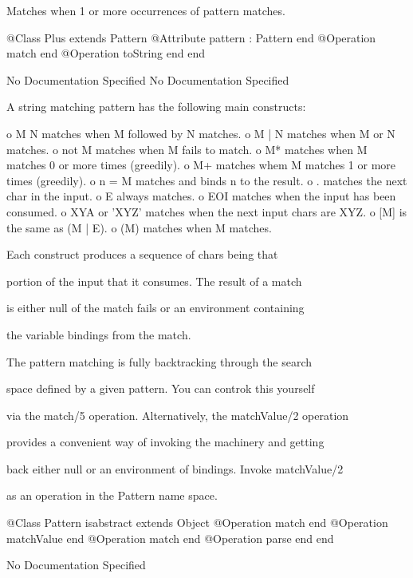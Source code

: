       Matches when 1 or more occurrences of pattern matches.
\begin{Interface}
@Class Plus extends Pattern
  @Attribute pattern : Pattern end
  @Operation match end
  @Operation toString end
end
\end{Interface}
No Documentation Specified
No Documentation Specified

      A string matching pattern has the following main constructs:

      
        o M N matches when M followed by N matches.
        o M | N matches when M or N matches.
        o not M matches when M fails to match.
        o M* matches when M matches 0 or more times (greedily).
        o M+ matches whem M matches 1 or more times (greedily).
        o n = M matches and binds n to the result.
        o . matches the next char in the input.
        o E always matches.
        o EOI matches when the input has been consumed.
        o XYA or 'XYZ' matches when the next input chars are XYZ.
        o [M] is the same as (M | E).
        o (M) matches when M matches.
        
      Each construct produces a sequence of chars being that

      portion of the input that it consumes. The result of a match

      is either null of the match fails or an environment containing

      the variable bindings from the match. 
      
      The pattern matching is fully backtracking through the search

      space defined by a given pattern. You can controk this yourself

      via the match/5 operation. Alternatively, the matchValue/2 operation

      provides a convenient way of invoking the machinery and getting

      back either null or an environment of bindings. Invoke matchValue/2

      as an operation in the Pattern name space.
\begin{Interface}
@Class Pattern isabstract extends Object
  @Operation match end
  @Operation matchValue end
  @Operation match end
  @Operation parse end
end
\end{Interface}
No Documentation Specified

